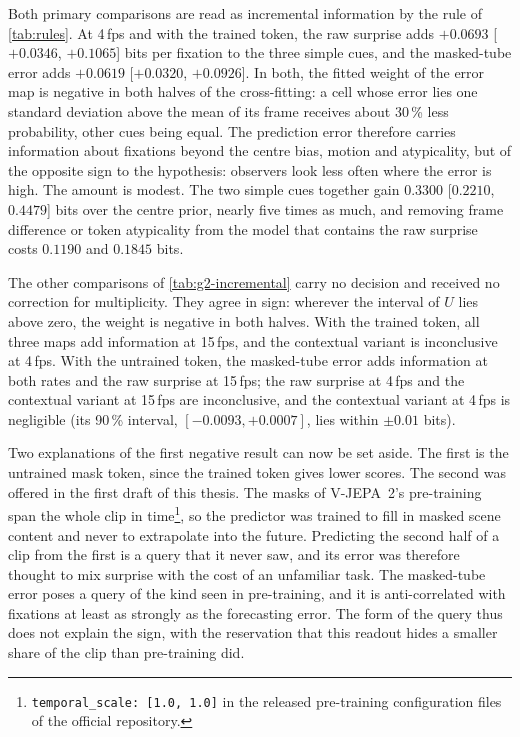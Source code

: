 Both primary comparisons are read as incremental information by the rule of
\cref{tab:rules}. At 4\,fps and with the trained token, the raw surprise adds
$+0.0693$ [$+0.0346$, $+0.1065$] bits per fixation to the three simple cues,
and the masked-tube error adds $+0.0619$ [$+0.0320$, $+0.0926$]. In both, the
fitted weight of the error map is negative in both halves of the
cross-fitting: a cell whose error lies one standard deviation above the mean
of its frame receives about 30\,\% less probability, other cues being equal.
The prediction error therefore carries information about fixations beyond the
centre bias, motion and atypicality, but of the opposite sign to the
hypothesis: observers look less often where the error is high. The amount is
modest. The two simple cues together gain $0.3300$ [$0.2210$, $0.4479$] bits
over the centre prior, nearly five times as much, and removing frame
difference or token atypicality from the model that contains the raw surprise
costs $0.1190$ and $0.1845$ bits.

The other comparisons of \cref{tab:g2-incremental} carry no decision and
received no correction for multiplicity. They agree in sign: wherever the
interval of $U$ lies above zero, the weight is negative in both halves. With
the trained token, all three maps add information at 15\,fps, and the
contextual variant is inconclusive at 4\,fps. With the untrained token, the
masked-tube error adds information at both rates and the raw surprise at
15\,fps; the raw surprise at 4\,fps and the contextual variant at 15\,fps are
inconclusive, and the contextual variant at 4\,fps is negligible (its 90\,\%
interval, $[-0.0093, +0.0007]$, lies within $\pm0.01$ bits).

Two explanations of the first negative result can now be set aside. The first
is the untrained mask token, since the trained token gives lower scores. The
second was offered in the first draft of this thesis. The masks of
\acrshort{V-JEPA}~2's pre-training span the whole clip in
time\footnote{\texttt{temporal\_scale: [1.0, 1.0]} in the released
pre-training configuration files of the official repository.}, so the predictor
was trained to fill in masked scene content and never to extrapolate into the
future. Predicting the second half of a clip from the first is a query that it
never saw, and its error was therefore thought to mix surprise with the cost
of an unfamiliar task. The masked-tube error poses a query of the kind seen in
pre-training, and it is anti-correlated with fixations at least as strongly as
the forecasting error. The form of the query thus does not explain the sign,
with the reservation that this readout hides a smaller share of the clip than
pre-training did.

